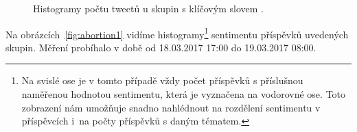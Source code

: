 \documentclass[12pt, a4paper]{article}
\numberwithin{equation}{section} 	%
\begin{document}
\begin{figure}[!h]
\centering
{}
\caption[]{Histogramy počtu tweetů u skupin s klíčovým slovem \textit{}.}
\label{fig:abortion1}
\end{figure}

Na obrázcích~\autoref{fig:abortion1} vidíme histogramy\footnote{Na svislé ose je v tomto případě vždy počet příspěvků s příslušnou naměřenou hodnotou sentimentu, která je vyznačena na vodorovné ose. Toto zobrazení nám umožňuje snadno nahlédnout na rozdělení sentimentu v příspěvcích i~na počty příspěvků s daným tématem.} sentimentu příspěvků uvedených skupin. Měření probíhalo v době od 18.03.2017 17:00 do 19.03.2017 08:00.
\end{document}

